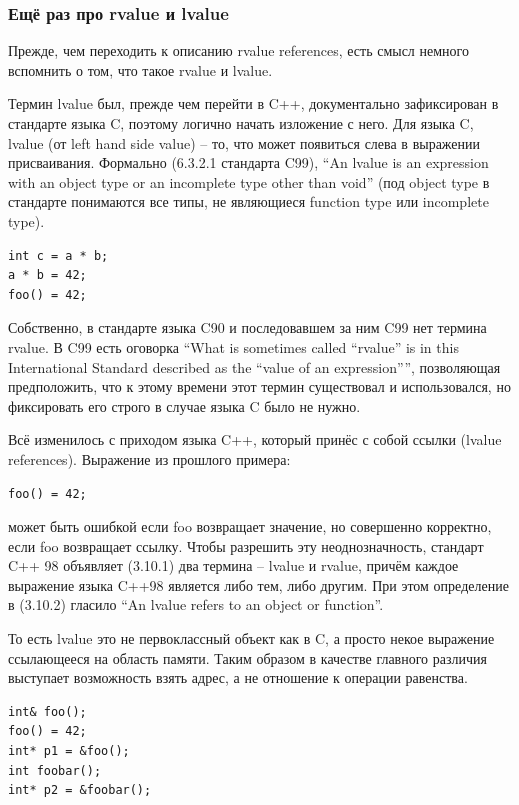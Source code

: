 \documentclass[a4paper,12pt,oneside]{article}
\begin{document}
\subsubsection{Ещё раз про rvalue и lvalue}\label{LRvaluesAgain}

Прежде, чем переходить к описанию rvalue references, есть смысл немного вспомнить о том, что такое rvalue и lvalue.

Термин lvalue был, прежде чем перейти в C++, документально зафиксирован в стандарте языка C, поэтому логично начать изложение с него. Для языка C, lvalue (от left hand side value) -- то, что может появиться слева в выражении присваивания. Формально (6.3.2.1 стандарта C99), ``An lvalue is an expression with an object type or an incomplete type other than void'' (под object type в стандарте понимаются все типы, не являющиеся function type или incomplete type).

\begin{lstlisting}
int c = a * b;
a * b = 42;
foo() = 42;
\end{lstlisting}

Собственно, в стандарте языка C90 и последовавшем за ним C99 нет термина rvalue. В C99 есть оговорка ``What is sometimes called ``rvalue'' is in this International Standard described as the ``value of an expression'''', позволяющая предположить, что к этому времени этот термин существовал и использовался, но фиксировать его строго в случае языка C было не нужно.

Всё изменилось с приходом языка C++, который принёс с собой ссылки (lvalue references). Выражение из прошлого примера:

\begin{lstlisting}
foo() = 42;
\end{lstlisting}

может быть ошибкой если foo возвращает значение, но совершенно корректно, если foo возвращает ссылку. Чтобы разрешить эту неоднозначность, стандарт C++ 98 объявляет (3.10.1) два термина -- lvalue и rvalue, причём каждое выражение языка C++98 является либо тем, либо другим. При этом определение в (3.10.2) гласило ``An lvalue refers to an object or function''.

То есть lvalue это не первоклассный объект как в C, а просто некое выражение ссылающееся на область памяти. Таким образом в качестве главного различия выступает возможность взять адрес, а не отношение к операции равенства.

\begin{lstlisting}
int& foo();
foo() = 42;
int* p1 = &foo();
int foobar();
int* p2 = &foobar();
\end{lstlisting}
\end{document}
